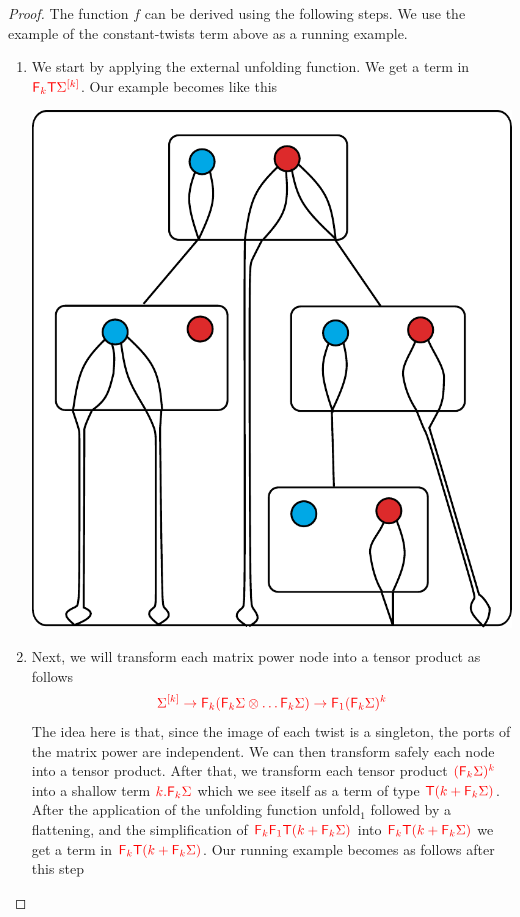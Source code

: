\begin{proof}
The function $f$ can be derived using the following steps. We use the example of the constant-twists term above as a running example.  
\begin{enumerate}
\item We start by applying the external unfolding function.  We get a term in ${\color{red}{{\color{red}{\mathsf F_{k}}}{\color{red}{\mathsf T}}\Sigma^{[k]}}}$. Our example becomes like this
   \begin{center}
\includegraphics[scale=.35]{one-unfold1.pdf}
 \end{center}
 \item Next, we will transform each matrix power node into a tensor product as follows 
 \begin{align*}
 {\color{red}{ \Sigma^{[k]} \rightarrow {\color{red}{\mathsf F_{k}}}({\color{red}{\mathsf F_{k}}}\Sigma \otimes \dots {\color{red}{\mathsf F_{k}}}\Sigma) \to {\color{red}{\mathsf F_{1}}}({\color{red}{\mathsf F_{k}}}\Sigma)^k}}
 \end{align*}
 The idea here is that, since the image of each twist is a singleton,  the ports of the matrix power are independent. We can then transform safely each node into a tensor product. After that, we transform each tensor product ${\color{red}{({\color{red}{\mathsf F_{k}}}\Sigma)^k}}$ into a shallow term ${\color{red}{k.{\color{red}{\mathsf F_{k}}}\Sigma}}$ which we see itself as a term of type ${\color{red}{{\color{red}{\mathsf T}}(k+{\color{red}{\mathsf F_{k}}}\Sigma)}}$. After the application of the unfolding function $\mathrm{unfold}_1$ followed by a flattening, and the simplification of ${\color{red}{{\color{red}{\mathsf F_{k}}}{\color{red}{\mathsf F_{1}}}{\color{red}{\mathsf T}}(k+{\color{red}{\mathsf F_{k}}}\Sigma)}}$ into ${\color{red}{{\color{red}{\mathsf F_{k}}}{\color{red}{\mathsf T}}(k+{\color{red}{\mathsf F_{k}}}\Sigma)}}$ we get a term in ${\color{red}{{\color{red}{\mathsf F_{k}}}{\color{red}{\mathsf T}}(k+{\color{red}{\mathsf F_{k}}}\Sigma)}}$. Our running example becomes as follows after this step

\end{enumerate}
\end{proof}
